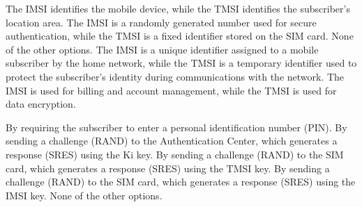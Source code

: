 \begin{questions}
    \begin{checkboxes}
        \choice The IMSI identifies the mobile device, while the TMSI identifies the subscriber's location area.
        \choice The IMSI is a randomly generated number used for secure authentication, while the TMSI is a fixed identifier stored on the SIM card.
        \choice None of the other options.
        \CorrectChoice The IMSI is a unique identifier assigned to a mobile subscriber by the home network, while the TMSI is a temporary identifier used to protect the subscriber's identity during communications with the network.
        \choice The IMSI is used for billing and account management, while the TMSI is used for data encryption.
    \end{checkboxes}

    \begin{checkboxes}
        \choice By requiring the subscriber to enter a personal identification number (PIN).
        \choice By sending a challenge (RAND) to the Authentication Center, which generates a response (SRES) using the Ki key.
        \choice By sending a challenge (RAND) to the SIM card, which generates a response (SRES) using the TMSI key.
        \choice By sending a challenge (RAND) to the SIM card, which generates a response (SRES) using the IMSI key.
        \CorrectChoice None of the other options.
    \end{checkboxes}


\end{questions}